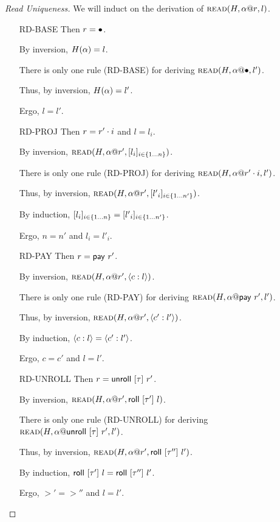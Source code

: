\begin{proof}[Read Uniqueness]
  We will induct on the derivation of $\textsc{read}({H},{{\alpha}@{r}},{l})$.
  \begin{itemize}
    \item[\textsc{RD-BASE}] Then $r = \bullet$.

      By inversion, $H(\alpha)=l$.

      There is only one rule (\textsc{RD-BASE}) for deriving $\textsc{read}({H},{{\alpha}@{\bullet}},{l'})$.

      Thus, by inversion, $H(\alpha)=l'$.

      Ergo, $l = l'$.
    \item[\textsc{RD-PROJ}] Then $r = {r'}\cdot{i}$ and $l = l_i$.

      By inversion, $\textsc{read}({H},{{\alpha}@{r'}},{[{{l}_{i}}]_{{i} \in \{1 \ldots {n}\} }})$.

      There is only one rule (\textsc{RD-PROJ}) for
      deriving $\textsc{read}({H},{{\alpha}@{{r'}\cdot{i}}},{l'})$.

      Thus, by inversion, $\textsc{read}({H},{{\alpha}@{r'}},{[{{l'}_{i}}]_{{i} \in \{1 \ldots {n'}\} }})$.

      By induction, $[{{l}_{i}}]_{{i} \in \{1 \ldots {n}\} } = [{{l'}_{i}}]_{{i} \in \{1 \ldots {n'}\} }$.

      Ergo, $n = n'$ and $l_i = l'_i$.
    \item[\textsc{RD-PAY}] Then $r = \mathsf{pay}~{r'}$.

      By inversion, $\textsc{read}({H},{{\alpha}@{r'}},{\langle{{c}:{l}}\rangle})$.

      There is only one rule (\textsc{RD-PAY}) for deriving $\textsc{read}({H},{{\alpha}@{\mathsf{pay}~{r'}}},{l'})$.

      Thus, by inversion, $\textsc{read}({H},{{\alpha}@{r'}},{\langle{{c'}:{l'}}\rangle})$.

      By induction, $\langle{{c}:{l}}\rangle = \langle{{c'}:{l'}}\rangle$.

      Ergo, $c = c'$ and $l = l'$.
    \item[\textsc{RD-UNROLL}] Then $r = \mathsf{unroll}~[{\tau}]~{r'}$.

      By inversion, $\textsc{read}({H},{{\alpha}@{r'}},{\mathsf{roll}~[{\tau'}]~{l}})$.

      There is only one rule (\textsc{RD-UNROLL}) for
      deriving $\textsc{read}({H},{{\alpha}@{\mathsf{unroll}~[{\tau}]~{r'}}},{l'})$.

      Thus, by inversion, $\textsc{read}({H},{{\alpha}@{r'}},{\mathsf{roll}~[{\tau''}]~{l'}})$.

      By induction, $\mathsf{roll}~[{\tau'}]~{l} = \mathsf{roll}~[{\tau''}]~{l'}$.

      Ergo, $\gt' = \gt''$ and $l = l'$.
  \end{itemize}
\end{proof}

